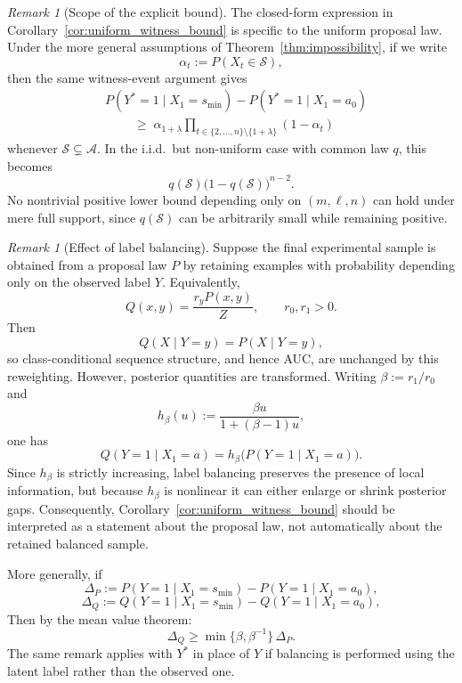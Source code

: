 \documentclass[fullpaper]{nldl}
\theoremstyle{plain}
\theoremstyle{definition}
\theoremstyle{remark}
\newtheorem{remark}[theorem]{Remark}
\begin{document}
\begin{remark}[Scope of the explicit bound]
\label{rem:scope_uniform_bound}
The closed-form expression in Corollary~\ref{cor:uniform_witness_bound} is
specific to the uniform proposal law. Under the more general assumptions of
Theorem~\ref{thm:impossibility}, if we write
\[
\alpha_t := P(X_t\in\mathcal{S}),
\]
then the same witness-event argument gives
\[
\begin{aligned}
&P(Y^*=1\mid X_1=s_{\min})
-
P(Y^*=1\mid X_1=a_0)\\
&\qquad\;\ge\;
\alpha_{1+\lambda}
\prod_{t\in\{2,\ldots,n\}\setminus\{1+\lambda\}}(1-\alpha_t)
\end{aligned}
\]
whenever $\mathcal{S}\subsetneq\mathcal{A}$.
In the i.i.d.\ but non-uniform case with common law $q$, this becomes
\[
q(\mathcal{S})\bigl(1-q(\mathcal{S})\bigr)^{n-2}.
\]
No nontrivial positive lower bound depending only on $(m,\ell,n)$ can hold under
mere full support, since $q(\mathcal{S})$ can be arbitrarily small while
remaining positive.
\end{remark}

\begin{remark}[Effect of label balancing]
\label{rem:label_balancing}
Suppose the final experimental sample is obtained from a proposal law $P$ by
retaining examples with probability depending only on the observed label $Y$.
Equivalently,
\[
Q(x,y)=\frac{r_y P(x,y)}{Z},
\qquad r_0,r_1>0.
\]
Then
\[
Q(X\mid Y=y)=P(X\mid Y=y),
\]
so class-conditional sequence structure, and hence AUC, are unchanged by this
reweighting. However, posterior quantities are transformed. Writing
$\beta:=r_1/r_0$ and
\[
h_\beta(u):=\frac{\beta u}{1+(\beta-1)u},
\]
one has
\[
Q(Y=1\mid X_1=a)
=
h_\beta\!\bigl(P(Y=1\mid X_1=a)\bigr).
\]
Since $h_\beta$ is strictly increasing, label balancing preserves the presence of
local information, but because $h_\beta$ is nonlinear it can either enlarge or
shrink posterior gaps. Consequently,
Corollary~\ref{cor:uniform_witness_bound} should be interpreted as a statement
about the proposal law, not automatically about the retained balanced sample.

More generally, if
\[
\Delta_P := P(Y=1\mid X_1=s_{\min}) - P(Y=1\mid X_1=a_0),
\]
\[
\Delta_Q := Q(Y=1\mid X_1=s_{\min}) - Q(Y=1\mid X_1=a_0),
\]
Then by the mean value theorem:
\[
\Delta_Q \ge \min\{\beta,\beta^{-1}\}\,\Delta_P.
\]
The same remark applies with $Y^*$ in place of $Y$ if balancing is performed
using the latent label rather than the observed one.
\end{remark}
\end{document}
